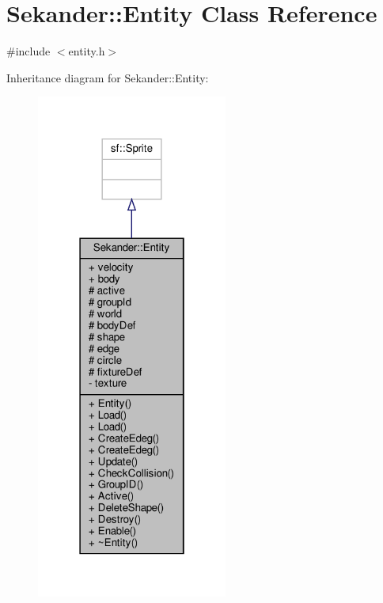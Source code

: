 \hypertarget{classSekander_1_1Entity}{}\section{Sekander\+:\+:Entity Class Reference}
\label{classSekander_1_1Entity}


{\ttfamily \#include $<$entity.\+h$>$}



Inheritance diagram for Sekander\+:\+:Entity\+:
\nopagebreak
\begin{figure}[H]
\begin{center}
\leavevmode
\includegraphics[width=178pt]{classSekander_1_1Entity__inherit__graph}
\end{center}
\end{figure}


